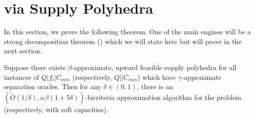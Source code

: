 \section{\mckc via Supply Polyhedra}\label{sec:o1}
\def\yy{y^\calT}
In this section, we prove the following theorem. One of the main engines will be a strong decomposition theorem () which we will state here but will prove in the next section.
\begin{theorem}\label{thm:reduction}
Suppose there exists $\beta$-approximate, upward feasible supply polyhedra  for all instances of $Q|f_i|C_{min}$ (respectively, $Q||C_{min}$) which have $\gamma$-approximate separation oracles.
Then for any $\delta\in(0,1)$, there is an $\left(\tilde{O}(1/\delta),\alpha\beta(1+5\delta)\right)$-bicriteria approximation algorithm for the \mckc problem (respectively, with soft capacities).
\end{theorem}
\noindent
	
